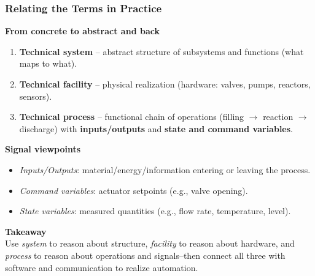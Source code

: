 \begin{frame}
	\frametitle{Relating the Terms in Practice}
  \textbf{From concrete to abstract and back}
  \begin{enumerate}
    \item \textbf{Technical system} -- abstract structure of subsystems and functions (what maps to what).
    \item \textbf{Technical facility} -- physical realization (hardware: valves, pumps, reactors, sensors).
    \item \textbf{Technical process} -- functional chain of operations (filling $\rightarrow$ reaction $\rightarrow$ discharge) with \textbf{inputs/outputs} and \textbf{state and command variables}.
  \end{enumerate}
  \vspace{2mm}
  \textbf{Signal viewpoints}
  \begin{itemize}
    \item \emph{Inputs/Outputs}: material/energy/information entering or leaving the process.
    \item \emph{Command variables}: actuator setpoints (e.g., valve opening).
    \item \emph{State variables}: measured quantities (e.g., flow rate, temperature, level).
  \end{itemize}
  \vspace{2mm}
  \textbf{Takeaway}\\
  Use \emph{system} to reason about structure, \emph{facility} to reason about hardware, and \emph{process} to reason about operations and signals--then connect all three with software and communication to realize automation.
\end{frame}
